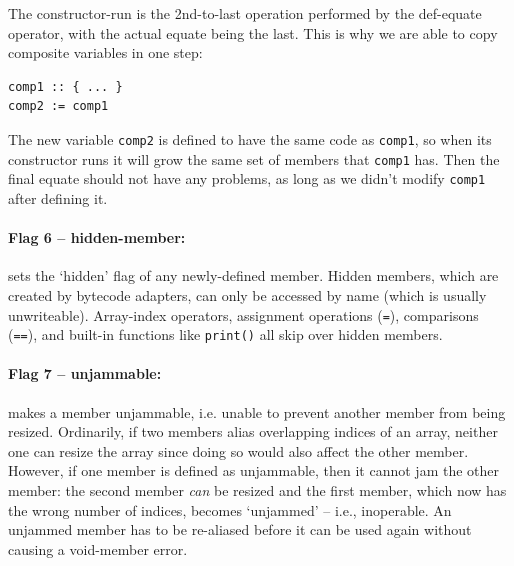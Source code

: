 \documentclass{article}
\newenvironment{code}{
       \begin{list}{}{
               \setlength{\leftmargin}{.4in}
               \setlength{\rightmargin}{0in}
               \setlength{\topsep}{.2in}
       }
       \small
       \item[] }
       { \end{list}   }
\begin{document}
The constructor-run is the 2nd-to-last operation performed by the def-equate operator, with the actual equate being the last.  This is why we are able to copy composite variables in one step:

\begin{code} \begin{verbatim}
comp1 :: { ... }
comp2 := comp1
\end{verbatim} \end{code}

\noindent The new variable \verb#comp2# is defined to have the same code as \verb#comp1#, so when its constructor runs it will grow the same set of members that \verb#comp1# has.  Then the final equate should not have any problems, as long as we didn't modify \verb#comp1# after defining it.\\


\paragraph{Flag 6 -- hidden-member:}  sets the `hidden' flag of any newly-defined member.  Hidden members, which are created by bytecode adapters, can only be accessed by name (which is usually unwriteable).  Array-index operators, assignment operations (\verb#=#), comparisons (\verb#==#), and built-in functions like \verb#print()# all skip over hidden members.\\


\paragraph{Flag 7 -- unjammable:} makes a member unjammable, i.e. unable to prevent another member from being resized.  Ordinarily, if two members alias overlapping indices of an array, neither one can resize the array since doing so would also affect the other member.  However, if one member is defined as unjammable, then it cannot jam the other member:  the second member \emph{can} be resized and the first member, which now has the wrong number of indices, becomes `unjammed' -- i.e., inoperable.  An unjammed member has to be re-aliased before it can be used again without causing a void-member error.\\



\end{document}
